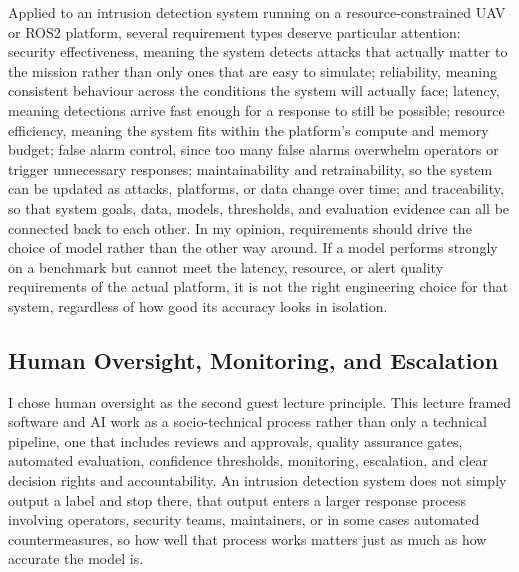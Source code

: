 \documentclass[11pt,a4paper]{article}
\begin{document}
Applied to an intrusion detection system running on a resource-constrained UAV or ROS2 platform, several requirement types deserve particular attention: security effectiveness, meaning the system detects attacks that actually matter to the mission rather than only ones that are easy to simulate; reliability, meaning consistent behaviour across the conditions the system will actually face; latency, meaning detections arrive fast enough for a response to still be possible; resource efficiency, meaning the system fits within the platform's compute and memory budget; false alarm control, since too many false alarms overwhelm operators or trigger unnecessary responses; maintainability and retrainability, so the system can be updated as attacks, platforms, or data change over time; and traceability, so that system goals, data, models, thresholds, and evaluation evidence can all be connected back to each other. In my opinion, requirements should drive the choice of model rather than the other way around. If a model performs strongly on a benchmark but cannot meet the latency, resource, or alert quality requirements of the actual platform, it is not the right engineering choice for that system, regardless of how good its accuracy looks in isolation.


\subsection{Human Oversight, Monitoring, and Escalation}

I chose human oversight as the second guest lecture principle. This lecture framed software and AI work as a socio-technical process rather than only a technical pipeline, one that includes reviews and approvals, quality assurance gates, automated evaluation, confidence thresholds, monitoring, escalation, and clear decision rights and accountability. An intrusion detection system does not simply output a label and stop there, that output enters a larger response process involving operators, security teams, maintainers, or in some cases automated countermeasures, so how well that process works matters just as much as how accurate the model is.
\end{document}
